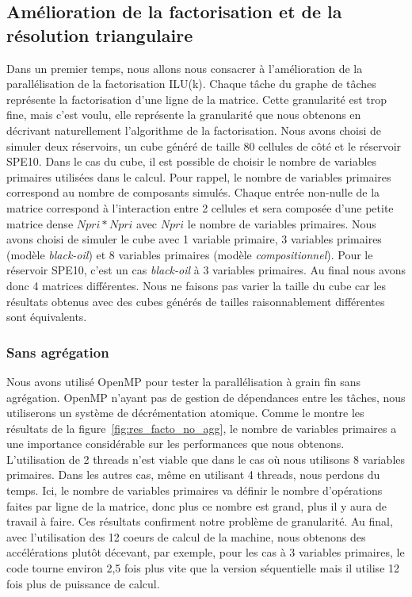 \subsection{Amélioration de la factorisation et de la résolution triangulaire}
Dans un premier temps, nous allons nous consacrer à l'amélioration de la parallélisation de la factorisation ILU(k).
%
Chaque tâche du graphe de tâches représente la factorisation d'une ligne de la matrice.
%
Cette granularité est trop fine, mais c'est voulu, elle représente la granularité que nous obtenons en décrivant naturellement l'algorithme de la factorisation.
%
Nous avons choisi de simuler deux réservoirs, un cube généré de taille 80 cellules de côté et le réservoir SPE10.
%
Dans le cas du cube, il est possible de choisir le nombre de variables primaires utilisées dans le calcul.
%
Pour rappel, le nombre de variables primaires correspond au nombre de composants simulés.
%
Chaque entrée non-nulle de la matrice correspond à l'interaction entre 2 cellules et sera composée d'une petite matrice dense $Npri*Npri$ avec $Npri$ le nombre de variables primaires.
%
Nous avons choisi de simuler le cube avec 1 variable primaire, 3 variables primaires (modèle {\em black-oil}) et 8 variables primaires (modèle {\em compositionnel}).
%
Pour le réservoir SPE10, c'est un cas {\em black-oil} à 3 variables primaires.
%
Au final nous avons donc 4 matrices différentes.
%
Nous ne faisons pas varier la taille du cube car les résultats obtenus avec des cubes générés de tailles raisonnablement différentes sont équivalents.


\subsubsection{Sans agrégation}
Nous avons utilisé OpenMP pour tester la parallélisation à grain fin sans agrégation.
%
OpenMP n'ayant pas de gestion de dépendances entre les tâches, nous utiliserons un système de décrémentation atomique.
%
Comme le montre les résultats de la figure~\ref{fig:res_facto_no_agg}, le nombre de variables primaires a une importance considérable sur les performances que nous obtenons.
%
L'utilisation de 2 threads n'est viable que dans le cas où nous utilisons 8 variables primaires.
%
Dans les autres cas, même en utilisant 4 threads, nous perdons du temps.
%
Ici, le nombre de variables primaires va définir le nombre d'opérations faites par ligne de la matrice, donc plus ce nombre est grand, plus il y aura de travail à faire.
%
Ces résultats confirment notre problème de granularité.
%
Au final, avec l'utilisation des 12 coeurs de calcul de la machine, nous obtenons des accélérations plutôt décevant, par exemple, pour les cas à 3 variables primaires, le code tourne environ 2,5 fois plus vite que la version séquentielle mais il utilise 12 fois plus de puissance de calcul.


